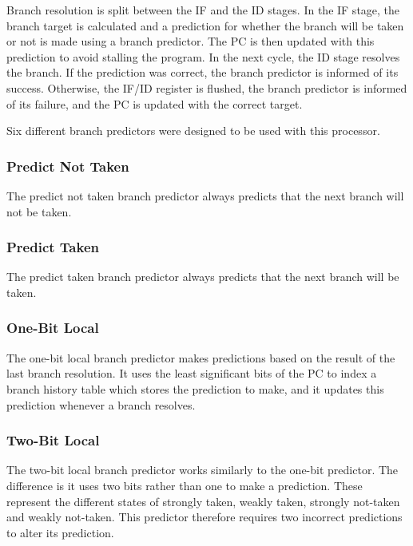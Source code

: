 \documentclass[conference,hidelinks]{IEEEtran}
\begin{document}
Branch resolution is split between the IF and the ID stages. In the IF stage, the branch target is calculated and a prediction for whether the branch will be taken or not is made using a branch predictor. The PC is then updated with this prediction to avoid stalling the program. In the next cycle, the ID stage resolves the branch. If the prediction was correct, the branch predictor is informed of its success. Otherwise, the IF/ID register is flushed, the branch predictor is informed of its failure, and the PC is updated with the correct target.

Six different branch predictors were designed to be used with this processor.

\subsubsection{Predict Not Taken}

The predict not taken branch predictor always predicts that the next branch will not be taken.

\subsubsection{Predict Taken}

The predict taken branch predictor always predicts that the next branch will be taken.

\subsubsection{One-Bit Local}

The one-bit local branch predictor makes predictions based on the result of the last branch resolution. It uses the least significant bits of the PC to index a branch history table which stores the prediction to make, and it updates this prediction whenever a branch resolves.

\subsubsection{Two-Bit Local}

The two-bit local branch predictor works similarly to the one-bit predictor. The difference is it uses two bits rather than one to make a prediction. These represent the different states of strongly taken, weakly taken, strongly not-taken and weakly not-taken. This predictor therefore requires two incorrect predictions to alter its prediction.
\end{document}
